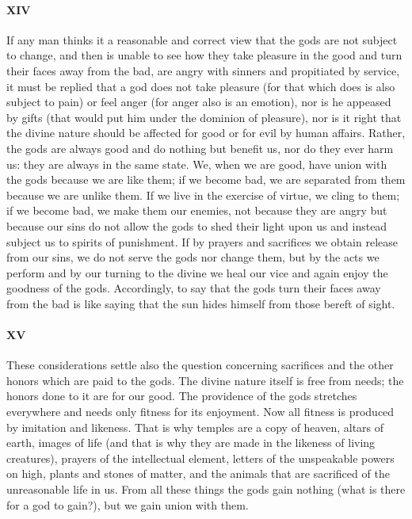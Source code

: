 \documentclass[12pt]{article}
\begin{document}
\paragraph{XIV} If any man thinks it a reasonable and correct view that the
gods are not subject to change, and then is unable to see how they take
pleasure in the good and turn their faces away from the bad, are angry with
sinners and propitiated by service, it must be replied that a god does not take
pleasure (for that which does is also subject to pain) or feel anger (for anger
also is an emotion), nor is he appeased by gifts (that would put him under the
dominion of pleasure), nor is it right that the divine nature should be
affected for good or for evil by human affairs. Rather, the gods are always
good and do nothing but benefit us, nor do they ever harm us: they are always
in the same state. We, when we are good, have union with the gods because we
are like them; if we become bad, we are separated from them because we are
unlike them. If we live in the exercise of virtue, we cling to them; if we
become bad, we make them our enemies, not because they are angry but because
our sins do not allow the gods to shed their light upon us and instead subject
us to spirits of punishment. If by prayers and sacrifices we obtain release
from our sins, we do not serve the gods nor change them, but by the acts we
perform and by our turning to the divine we heal our vice and again enjoy the
goodness of the gods. Accordingly, to say that the gods turn their faces away
from the bad is like saying that the sun hides himself from those bereft of
sight.

\paragraph{XV} These considerations settle also the question concerning
sacrifices and the other honors which are paid to the gods. The divine nature
itself is free from needs; the honors done to it are for our good. The
providence of the gods stretches everywhere and needs only fitness for its
enjoyment. Now all fitness is produced by imitation and likeness. That is why
temples are a copy of heaven, altars of earth, images of life (and that is why
they are made in the likeness of living creatures), prayers of the intellectual
element, letters of the unspeakable powers on high, plants and stones of
matter, and the animals that are sacrificed of the unreasonable life in us.
From all these things the gods gain nothing (what is there for a god to gain?),
but we gain union with them.
\end{document}

